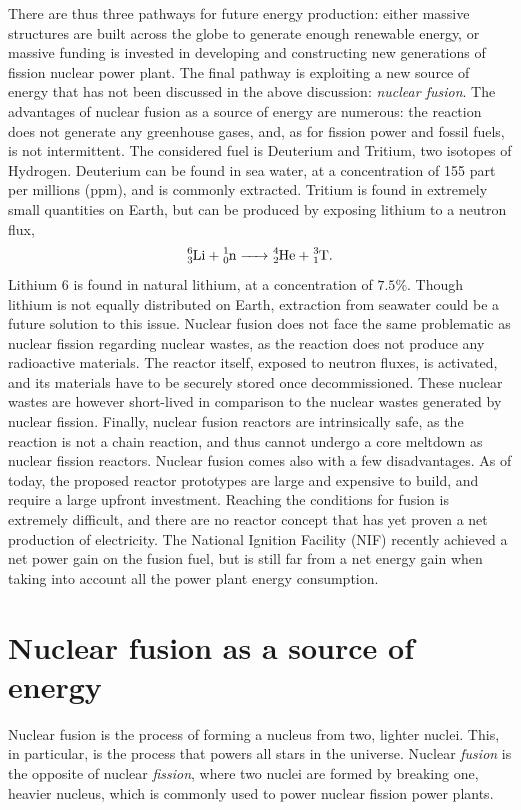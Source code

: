 \documentclass[my_thesis.tex]{subfiles}
\begin{document}
There are thus three pathways for future energy production: either massive structures are built across the globe to generate enough renewable energy, or massive funding is invested in developing and constructing new generations of fission nuclear power plant. The final pathway is exploiting a new source of energy that has not been discussed in the above discussion: \emph{nuclear fusion}. The advantages of nuclear fusion as a source of energy are numerous: the reaction does not generate any greenhouse gases, and, as for fission power and fossil fuels, is not intermittent. The considered fuel is Deuterium and Tritium, two isotopes of Hydrogen. Deuterium can be found in sea water, at a concentration of 155 part per millions (ppm), and is commonly extracted. Tritium is found in extremely small quantities on Earth, but can be produced by exposing lithium to a neutron flux,
\begin{equation}
    \ce{^{6}_{3}Li + ^{1}_{0}n -> ^{4}_{2}He + ^{3}_{1}T}.
\end{equation}
Lithium 6 is found in natural lithium, at a concentration of $7.5\%$. Though lithium is not equally distributed on Earth, extraction from seawater \citep{ZHAO2019113389} could be a future solution to this issue. Nuclear fusion does not face the same problematic as nuclear fission regarding nuclear wastes, as the reaction does not produce any radioactive materials. The reactor itself, exposed to neutron fluxes, is activated, and its materials have to be securely stored once decommissioned. These nuclear wastes are however short-lived in comparison to the nuclear wastes generated by nuclear fission. Finally, nuclear fusion reactors are intrinsically safe, as the reaction is not a chain reaction, and thus cannot undergo a core meltdown as nuclear fission reactors. Nuclear fusion comes also with a few disadvantages. As of today, the proposed reactor prototypes are large and expensive to build, and require a large upfront investment. Reaching the conditions for fusion is extremely difficult, and there are no reactor concept that has yet proven a net production of electricity. The National Ignition Facility (NIF) recently achieved a net power gain \citep{nif_source} on the fusion fuel, but is still far from a net energy gain when taking into account all the power plant energy consumption.

\section{Nuclear fusion as a source of energy}
Nuclear fusion is the process of forming a nucleus from two, lighter nuclei. This, in particular, is the process that powers all stars in the universe. Nuclear \emph{fusion} is the opposite of nuclear \emph{fission}, where two nuclei are formed by breaking one, heavier nucleus, which is commonly used to power nuclear fission power plants.
\end{document}
